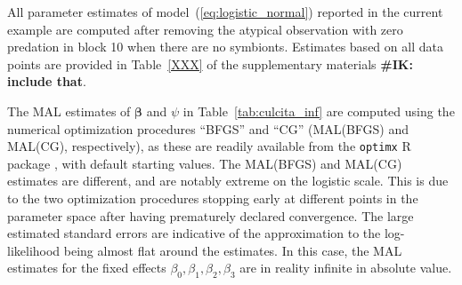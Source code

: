 \documentclass[11pt, a4paper]{article}
\newcommand*{\bb}{\boldsymbol}
\newcommand{\IK}[1]{{\noindent \color{blue} \bf \#IK: #1}}
\theoremstyle{example} \newtheorem{example}{Example}[section]
\theoremstyle{theorem} \newtheorem{theorem}{Theorem}[section]
\def\bbeta{\bb{\beta}}
\begin{document}
All parameter estimates of model~(\ref{eq:logistic_normal})
reported in the current example are computed after removing the
atypical observation with zero predation in block 10 when there are no
symbionts. Estimates based on all data points are provided in
Table~\ref{XXX} of the supplementary materials \IK{include that}.

The MAL estimates of $\bbeta$ and $\psi$ in
Table~\ref{tab:culcita_inf} are computed using the numerical
optimization procedures ``BFGS'' and ``CG'' (MAL(BFGS) and MAL(CG),
respectively), as these are readily available from the \texttt{optimx} R
package \citep[see][Section 3 for details]{nash+varadhan:2011}, with
default starting values. The MAL(BFGS) and MAL(CG) estimates are different,
and are notably extreme on the logistic scale. This is due to the two
optimization procedures stopping early at different points in the
parameter space after having prematurely declared convergence. The large estimated
standard errors are indicative of the approximation
to the log-likelihood being almost flat around the estimates. In this
case, the MAL estimates for the fixed effects
$\beta_0, \beta_1, \beta_2, \beta_3$ are in reality infinite in
absolute value.
\end{document}
